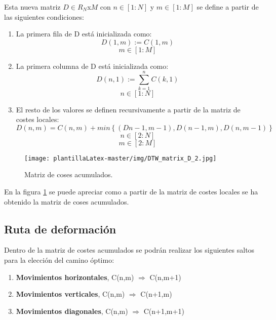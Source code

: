 Esta nueva matriz $D \in R _N$x$M $ con $n \in [1:N]$ y $m \in [1:M]$ se define a partir de las siguientes condiciones:
\begin{enumerate}
    \item La primera fila de D está inicializada como:
    \begin{equation}
        D(1,m):=C(1,m)  
    \end{equation}
    \[m \in [1:M]\]
    \item La primera columna de D está inicializada como:
    \begin{equation}
        D(n,1):=\sum_{k=1}^{n}C(k,1)  
    \end{equation}
    \[n \in [1:N]\]
    \item El resto de los valores se definen recursivamente a partir de la matriz de costes locales:
    \begin{equation}
        D(n,m)=C(n,m)+min\left\{(D  n−1,m−1),D(n−1,m),D(n,m−1)\right\}
        \end{equation}
        \[n \in [2:N]\] 
        \[m \in [2:M]\]
    
\end{enumerate}

\begin{figure}
    \centering
    \texttt{[image: plantillaLatex-master/img/DTW\_matrix\_D\_2.jpg]}
    \caption{Matriz de coses acumulados.}
    \label{fig:dtw4}
\end{figure}

En la figura \ref{fig:dtw4} se puede apreciar como a partir de la matriz de costes locales se ha obtenido la matriz de coses acumulados. 

\newpage
\subsection{Ruta de deformación}
Dentro de la matriz de costes acumulados se podrán realizar los siguientes saltos para la elección del camino óptimo:
\begin{enumerate}
    \item \textbf{Movimientos horizontales}, C(n,m) $\Rightarrow$ C(n,m+1) \\
    \item \textbf{Movimientos verticales}, C(n,m) $\Rightarrow$ C(n+1,m) \\
    \item \textbf{Movimientos diagonales}, C(n,m) $\Rightarrow$ C(n+1,m+1)
\end{enumerate}

